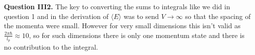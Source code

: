 \documentclass[letterpaper, reqno,11pt]{article}
\begin{document}

{\medskip\noindent\bf Question III2.} The key to converting the sums to integrals like we did in question 1 and in the derivation of $\langle E \rangle $ was to send $V\to \infty$ so that the spacing of the momenta were small. However for very small dimensions this isn't valid as $\frac{2\pi \hbar}{l_p}\approx 10$, so for such dimensions there is only one momentum state and there is no contribution to the integral.
\end{document}
